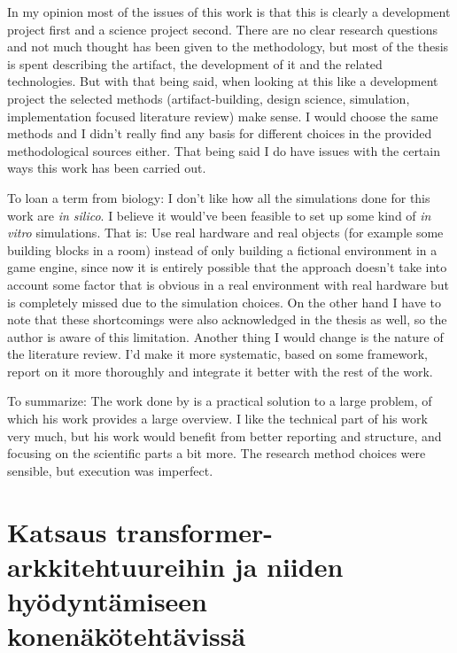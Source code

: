 \documentclass{article}
\begin{document}
	\par In my opinion most of the issues of this work is that this is 
clearly a development project first and a science project second. There are no 
clear research questions and not much thought has been given to the 
methodology, but most of the thesis is spent describing the artifact, the 
development of it and the related technologies. But with that being said, when 
looking at this like a development project the selected methods 
(artifact-building, design science, simulation, implementation focused 
literature review) make sense. I would choose the same methods and I didn't 
really find any basis for different choices in the provided methodological 
sources either. That being said I do have issues with the certain ways this 
work has been carried out.
	\par To loan a term from biology: I don't like how all the simulations 
done for this work are \textit{in silico}. I believe it would've been feasible 
to set up some kind of \textit{in vitro} simulations. That is: Use real 
hardware and real objects (for example some building blocks in a room) instead 
of only building a fictional environment in a game engine, since now it is 
entirely possible that the approach doesn't take into account some factor that 
is obvious in a real environment with real hardware but is completely missed 
due to the simulation choices. On the other hand I have to note that these 
shortcomings were also acknowledged in the thesis as well, so the author is 
aware of this limitation.\parencite{T2} Another thing I would change is the 
nature of the literature review. I'd make it more systematic, based on some 
framework, report on it more thoroughly and integrate it better with the rest 
of the work. 
	\par To summarize: The work done by \textcite{T2} is a practical 
solution to a large problem, of which his work provides a large overview. I 
like the technical part of his work very much, but his work would benefit from 
better reporting and structure, and focusing on the scientific parts a bit 
more. The research method choices were sensible, but execution was imperfect. 

\newpage
\section{Katsaus transformer-arkkitehtuureihin ja niiden hyödyntämiseen konenäkötehtävissä}
\end{document}
